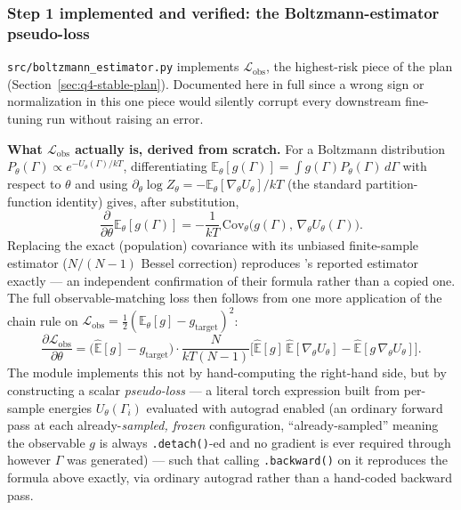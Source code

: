 \documentclass[11pt]{article}
\begin{document}
\subsubsection{Step 1 implemented and verified: the Boltzmann-estimator pseudo-loss}
\label{sec:q4-stable-step1}

\texttt{src/boltzmann\_estimator.py} implements $\mathcal{L}_{\text{obs}}$,
the highest-risk piece of the plan
(Section~\ref{sec:q4-stable-plan}). Documented here in full since a wrong
sign or normalization in this one piece would silently corrupt every
downstream fine-tuning run without raising an error.

\textbf{What $\mathcal{L}_{\text{obs}}$ actually is, derived from scratch.}
For a Boltzmann distribution $P_\theta(\Gamma) \propto
e^{-U_\theta(\Gamma)/kT}$, differentiating $\mathbb{E}_\theta[g(\Gamma)] =
\int g(\Gamma) P_\theta(\Gamma)\,d\Gamma$ with respect to $\theta$ and using
$\partial_\theta \log Z_\theta = -\mathbb{E}_\theta[\nabla_\theta
U_\theta]/kT$ (the standard partition-function identity) gives, after
substitution,
\[
\frac{\partial}{\partial\theta}\mathbb{E}_\theta[g(\Gamma)] =
-\frac{1}{kT}\,\mathrm{Cov}_\theta\big(g(\Gamma),\,\nabla_\theta U_\theta(\Gamma)\big).
\]
Replacing the exact (population) covariance with its unbiased finite-sample
estimator ($N/(N{-}1)$ Bessel correction) reproduces
\citet{raja2025stable}'s reported estimator exactly --- an independent
confirmation of their formula rather than a copied one. The full
observable-matching loss then follows from one more application of the
chain rule on $\mathcal{L}_{\text{obs}}=\tfrac12(\mathbb{E}_\theta[g]-g_{\text{target}})^2$:
\[
\frac{\partial\mathcal{L}_{\text{obs}}}{\partial\theta} =
\big(\hat{\mathbb{E}}[g]-g_{\text{target}}\big)\cdot
\frac{N}{kT(N-1)}\Big[\hat{\mathbb{E}}[g]\,\hat{\mathbb{E}}[\nabla_\theta U_\theta]
-\hat{\mathbb{E}}[g\,\nabla_\theta U_\theta]\Big].
\]
The module implements this not by hand-computing the right-hand side, but
by constructing a scalar \emph{pseudo-loss} --- a literal torch expression
built from per-sample energies $U_\theta(\Gamma_i)$ evaluated with
autograd enabled (an ordinary forward pass at each already-\emph{sampled,
frozen} configuration, ``already-sampled'' meaning the observable $g$ is
always \texttt{.detach()}-ed and no gradient is ever required through
however $\Gamma$ was generated) --- such that calling \texttt{.backward()}
on it reproduces the formula above exactly, via ordinary autograd rather
than a hand-coded backward pass.
\end{document}

